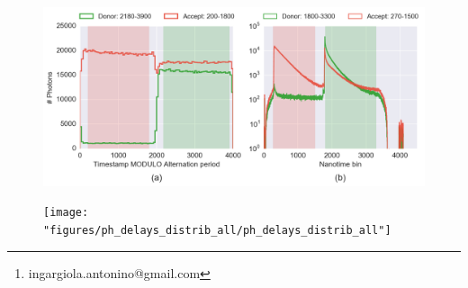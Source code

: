 
\title{}

\author[1]{Antonino Ingargiola\thanks{ingargiola.antonino@gmail.com}}
\author[1]{Eitan Lerner}
\author[1]{SangYoon Chung}
\author[1]{Shimon Weiss}
\author[1]{Xavier Michalet}


\verbatimfont{\small}
\lstset{language=Python}

\maketitle

\begin{abstract}

\end{abstract}

\tableofcontents







\begin{figure}
\begin{center}
\includegraphics[width=\doublefig]{"figures/ALEX_alternation_double/ALEX_alternation_double"}
\caption[]{}
\end{center}
\end{figure}





\begin{figure}
\begin{center}
\texttt{[image: "figures/ph\_delays\_distrib\_all/ph\_delays\_distrib\_all"]}
\caption[]{}
\end{center}
\end{figure}

